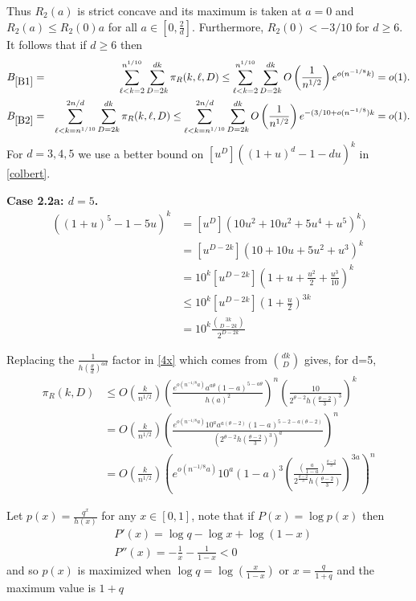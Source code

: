 \documentclass[11pt]{article}
\def\th{\theta}
\def\p{\pi}
\newcommand{\brac}[1]{\left(#1\right)}
\newcommand{\bfrac}[2]{\brac{\frac{#1}{#2}}}
\begin{document}
Thus $R_2(a)$ is strict concave and its maximum is taken at $a=0$ and $R_2(a)\leq R_2(0)a$ for all $a\in[0,\frac{2}{d}]$.
Furthermore, $R_2(0)<-3/10$ for $d\geq 6$. It follows that if $d\geq 6$ then
\begin{eqnarray}
B_{\ref{B1}}&=&\sum_{\ell<k=2}^{n^{1/10}}\sum_{D=2k}^{dk}
\p_R(k,\ell,D)\leq \sum_{\ell<k=2}^{n^{1/10}}\sum_{D=2k}^{dk}O\bfrac{1}{n^{1/2}}e^{o(n^{-1/8}k)}=o(1).\label{B1}\\
B_{\ref{B2}}&=&\sum_{\ell<k=n^{1/10}}^{2n/d}\sum_{D=2k}^{dk}
\p_R(k,\ell,D)\leq \sum_{\ell<k=n^{1/10}}^{2n/d}\sum_{D=2k}^{dk}O\bfrac{1}{n^{1/2}}e^{-(3/10+o(n^{-1/8})k}=o(1).
\label{B2}
\end{eqnarray}
For $d=3,4,5$ we use a better bound on $[u^D]((1+u)^d-1-du)^k$ in \eqref{colbert}. 

{\bf Case 2.2a: $d=5$.}
\begin{align*}
[u^D]((1+u)^5-1-5u)^k &= [u^D](10u^2 + 10u^2+5u^4+u^5)^k)\\
&= [u^{D-2k}](10+10u+5u^2+u^3)^k\\
&= 10^k[u^{D-2k}]\brac{1+u+\frac{u^2}{2}+\frac{u^3}{10}}^k\\
&\le 10^k[u^{D-2k}]\brac{1+\frac{u}{2}}^{3k}\\
&= 10^k \frac{\binom{3k}{D-2k}}{2^{D-2k}}
\end{align*}

Replacing the $\frac{1}{h\bfrac{\th}{d}^{ad}}$ factor in \eqref{4x} which comes from $\binom{dk}{D}$ gives, for d=5,
\begin{align}
\p_R(k,D)&\leq O\bfrac{k}{n^{1/2}}\bfrac{e^{o(n^{-1/8}a)}
a^{a\th}(1-a)^{5-a\th}}{h(a)^2}^n\bfrac{10}{2^{\th-2} h\bfrac{\th-2}{3}^3}^k\nonumber\\
&=O\bfrac{k}{n^{1/2}}\bfrac{e^{o(n^{-1/8}a)}10^a a^{a(\th-2)}(1-a)^{5-2-a(\th-2)}}{\brac{2^{\th-2}h\bfrac{\th-2}{3}^3}^a}^n\nonumber\\
&=O\bfrac{k}{n^{1/2}}\brac{e^{o(n^{-1/8}a)}10^a(1-a)^{3}
\bfrac{\bfrac{a}{1-a}^{\frac{\th-2}{3}}}{2^{\frac{\th-2}{3}}h\bfrac{\th-2}{3}}^{3a}}^n\label{6b}
\end{align}

Let $p(x) = \frac{q^x}{h(x)}$ for any $x\in[0,1]$, note that if $P(x)=\log p(x)$ then
\begin{align*}
&P'(x) = \log q - \log x +\log(1-x)\\
&P''(x)=-\frac{1}{x}-\frac{1}{1-x}<0
\end{align*}
and so $p(x)$ is maximized when $\log q = \log\bfrac{x}{1-x}$ or $x = \frac{q}{1+q}$ and the maximum value is $1+q$
\end{document}
